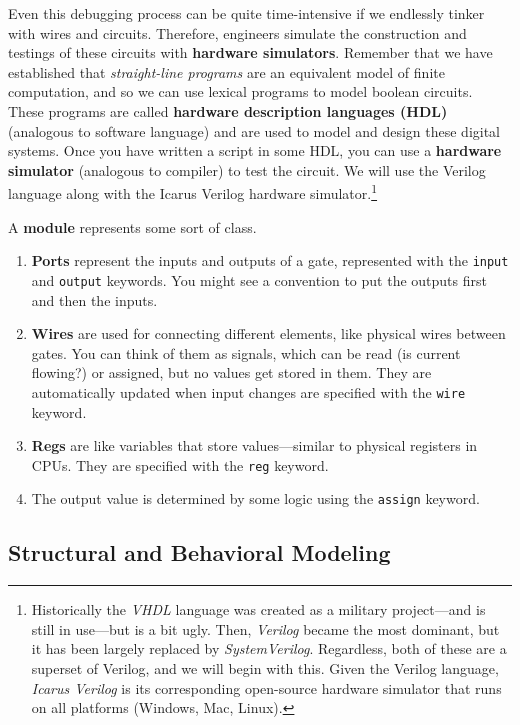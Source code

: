   Even this debugging process can be quite time-intensive if we endlessly tinker with wires and circuits. Therefore, engineers simulate the construction and testings of these circuits with \textbf{hardware simulators}. Remember that we have established that \textit{straight-line programs} are an equivalent model of finite computation, and so we can use lexical programs to model boolean circuits. These programs are called \textbf{hardware description languages (HDL)} (analogous to software language) and are used to model and design these digital systems. Once you have written a script in some HDL, you can use a \textbf{hardware simulator} (analogous to compiler) to test the circuit. We will use the Verilog language along with the Icarus Verilog hardware simulator.\footnote{Historically the \textit{VHDL} language was created as a military project---and is still in use---but is a bit ugly.  Then, \textit{Verilog} became the most dominant, but it has been largely replaced by \textit{SystemVerilog}. Regardless, both of these are a superset of Verilog, and we will begin with this. Given the Verilog language, \textit{Icarus Verilog} is its corresponding open-source hardware simulator that runs on all platforms (Windows, Mac, Linux).}

  \begin{definition}[Module]
    A \textbf{module} represents some sort of class. 
    \begin{enumerate}
      \item \textbf{Ports} represent the inputs and outputs of a gate, represented with the \texttt{input} and \texttt{output} keywords. You might see a convention to put the outputs first and then the inputs. 
      \item \textbf{Wires} are used for connecting different elements, like physical wires between gates. You can think of them as signals, which can be read (is current flowing?) or assigned, but no values get stored in them. They are automatically updated when input changes are specified with the \texttt{wire} keyword. 
      \item \textbf{Regs} are like variables that store values---similar to physical registers in CPUs. They are specified with the \texttt{reg} keyword. 
      \item The output value is determined by some logic using the \texttt{assign} keyword. 
    \end{enumerate}
  \end{definition}

\subsection{Structural and Behavioral Modeling}

